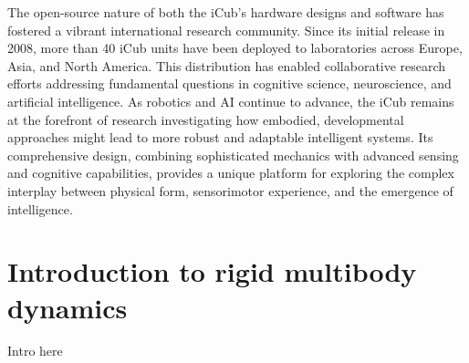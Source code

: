 The open-source nature of both the iCub's hardware designs and software has fostered a vibrant international research community. Since its initial release in 2008, more than 40 iCub units have been deployed to laboratories across Europe, Asia, and North America. This distribution has enabled collaborative research efforts addressing fundamental questions in cognitive science, neuroscience, and artificial intelligence.
As robotics and AI continue to advance, the iCub remains at the forefront of research investigating how embodied, developmental approaches might lead to more robust and adaptable intelligent systems. Its comprehensive design, combining sophisticated mechanics with advanced sensing and cognitive capabilities, provides a unique platform for exploring the complex interplay between physical form, sensorimotor experience, and the emergence of intelligence.

\chapter{Introduction to rigid multibody dynamics}
Intro here

